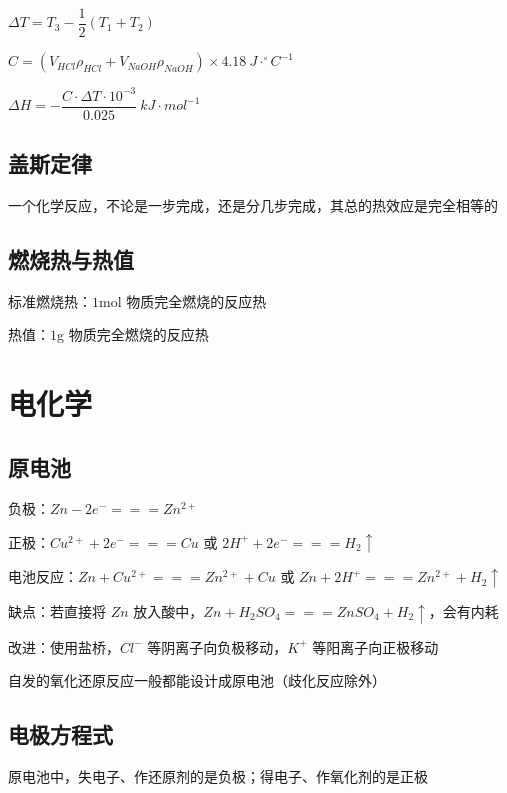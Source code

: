 \documentclass[UTF8,zihao=-4,openany]{ctexbook}
\begin{document}
$\Delta T=T_3-\dfrac{1}{2}(T_1+T_2)$\par

$C=(V_{HCl}\rho_{HCl}+V_{NaOH}\rho_{NaOH})\times4.18\ J\cdot ^{\circ}C^{-1}$\par

$\Delta H=-\dfrac{C\cdot\Delta T\cdot10^{-3}}{0.025}\ kJ\cdot mol^{-1}$\par
\subsection{盖斯定律}
一个化学反应，不论是一步完成，还是分几步完成，其总的热效应是完全相等的\par
\subsection{燃烧热与热值}
标准燃烧热：$1$mol 物质完全燃烧的反应热\par

热值：$1$g 物质完全燃烧的反应热\par
\section{电化学}
\subsection{原电池}
负极：$Zn-2e^-=\!=\!=Zn^{2+}$\par

正极：$Cu^{2+}+2e^-=\!=\!=Cu$ 或 $2H^++2e^-=\!=\!=H_2\uparrow$\par

电池反应：$Zn+Cu^{2+}=\!=\!=Zn^{2+}+Cu$ 或 $Zn+2H^+=\!=\!=Zn^{2+}+H_2\uparrow$\par

缺点：若直接将 $Zn$ 放入酸中，$Zn+H_2SO_4=\!=\!=ZnSO_4+H_2\uparrow$，会有内耗\par

改进：使用盐桥，$Cl^-$ 等阴离子向负极移动，$K^+$ 等阳离子向正极移动\par

自发的氧化还原反应一般都能设计成原电池（歧化反应除外）\par
\subsection{电极方程式}
原电池中，失电子、作还原剂的是负极；得电子、作氧化剂的是正极\par
\end{document}
